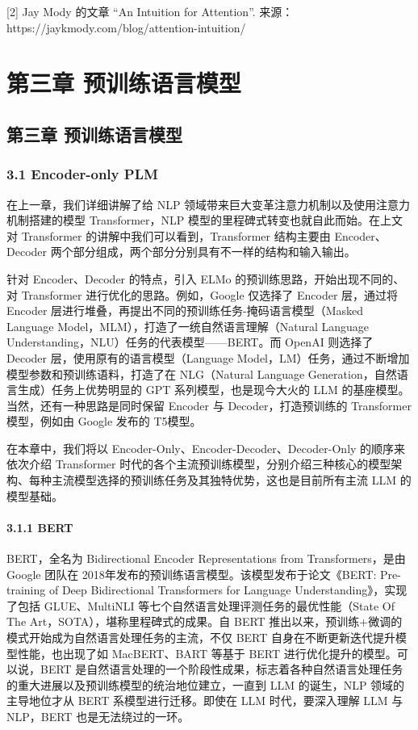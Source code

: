 \documentclass[12pt,a4paper]{book}
\begin{document}
{[}2{]} Jay Mody 的文章 ``An Intuition for Attention''.
来源：https://jaykmody.com/blog/attention-intuition/

\chapter{第三章 预训练语言模型}
{
\setcounter{tocdepth}{3}
\tableofcontents
}
\section{第三章
预训练语言模型}\label{ux7b2cux4e09ux7ae0-ux9884ux8badux7ec3ux8bedux8a00ux6a21ux578b}

\subsection{3.1 Encoder-only PLM}\label{encoder-only-plm}

在上一章，我们详细讲解了给 NLP
领域带来巨大变革注意力机制以及使用注意力机制搭建的模型 Transformer，NLP
模型的里程碑式转变也就自此而始。在上文对 Transformer
的讲解中我们可以看到，Transformer 结构主要由 Encoder、Decoder
两个部分组成，两个部分分别具有不一样的结构和输入输出。

针对 Encoder、Decoder 的特点，引入 ELMo 的预训练思路，开始出现不同的、对
Transformer 进行优化的思路。例如，Google 仅选择了 Encoder 层，通过将
Encoder 层进行堆叠，再提出不同的预训练任务-掩码语言模型（Masked Language
Model，MLM），打造了一统自然语言理解（Natural Language
Understanding，NLU）任务的代表模型------BERT。而 OpenAI 则选择了 Decoder
层，使用原有的语言模型（Language
Model，LM）任务，通过不断增加模型参数和预训练语料，打造了在 NLG（Natural
Language Generation，自然语言生成）任务上优势明显的 GPT
系列模型，也是现今大火的 LLM 的基座模型。当然，还有一种思路是同时保留
Encoder 与 Decoder，打造预训练的 Transformer 模型，例如由 Google 发布的
T5模型。

在本章中，我们将以 Encoder-Only、Encoder-Decoder、Decoder-Only
的顺序来依次介绍 Transformer
时代的各个主流预训练模型，分别介绍三种核心的模型架构、每种主流模型选择的预训练任务及其独特优势，这也是目前所有主流
LLM 的模型基础。

\subsubsection{3.1.1 BERT}\label{bert}

BERT，全名为 Bidirectional Encoder Representations from
Transformers，是由 Google 团队在
2018年发布的预训练语言模型。该模型发布于论文《BERT: Pre-training of Deep
Bidirectional Transformers for Language Understanding》，实现了包括
GLUE、MultiNLI 等七个自然语言处理评测任务的最优性能（State Of The
Art，SOTA），堪称里程碑式的成果。自 BERT
推出以来，预训练+微调的模式开始成为自然语言处理任务的主流，不仅 BERT
自身在不断更新迭代提升模型性能，也出现了如 MacBERT、BART 等基于 BERT
进行优化提升的模型。可以说，BERT
是自然语言处理的一个阶段性成果，标志着各种自然语言处理任务的重大进展以及预训练模型的统治地位建立，一直到
LLM 的诞生，NLP 领域的主导地位才从 BERT 系模型进行迁移。即使在 LLM
时代，要深入理解 LLM 与 NLP，BERT 也是无法绕过的一环。
\end{document}
